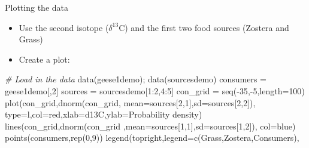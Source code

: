 \documentclass[
  ignorenonframetext,
  aspectratio=169]{beamer}
\newenvironment{Shaded}{\begin{snugshade}}{\end{snugshade}}
\newcommand{\AttributeTok}[1]{\textcolor[rgb]{0.77,0.63,0.00}{#1}}
\newcommand{\CommentTok}[1]{\textcolor[rgb]{0.56,0.35,0.01}{\textit{#1}}}
\newcommand{\DecValTok}[1]{\textcolor[rgb]{0.00,0.00,0.81}{#1}}
\newcommand{\FunctionTok}[1]{\textcolor[rgb]{0.00,0.00,0.00}{#1}}
\newcommand{\NormalTok}[1]{#1}
\newcommand{\OtherTok}[1]{\textcolor[rgb]{0.56,0.35,0.01}{#1}}
\newcommand{\SpecialCharTok}[1]{\textcolor[rgb]{0.00,0.00,0.00}{#1}}
\newcommand{\StringTok}[1]{\textcolor[rgb]{0.31,0.60,0.02}{#1}}
\providecommand{\tightlist}{%
  \setlength{\itemsep}{0pt}\setlength{\parskip}{0pt}}
\begin{document}
\begin{frame}[fragile]{Plotting the data}
\protect\hypertarget{plotting-the-data}{}
\small

\begin{itemize}
\tightlist
\item
  Use the second isotope (\(\delta^{13}\)C) and the first two food
  sources (Zostera and Grass)
\item
  Create a plot:
\end{itemize}

\begin{Shaded}
\begin{Highlighting}[]
\CommentTok{\# Load in the data}
\FunctionTok{data}\NormalTok{(geese1demo); }\FunctionTok{data}\NormalTok{(sourcesdemo)}
\NormalTok{consumers }\OtherTok{=}\NormalTok{ geese1demo[,}\DecValTok{2}\NormalTok{]}
\NormalTok{sources }\OtherTok{=}\NormalTok{ sourcesdemo[}\DecValTok{1}\SpecialCharTok{:}\DecValTok{2}\NormalTok{,}\DecValTok{4}\SpecialCharTok{:}\DecValTok{5}\NormalTok{]}
\NormalTok{con\_grid }\OtherTok{=} \FunctionTok{seq}\NormalTok{(}\SpecialCharTok{{-}}\DecValTok{35}\NormalTok{,}\SpecialCharTok{{-}}\DecValTok{5}\NormalTok{,}\AttributeTok{length=}\DecValTok{100}\NormalTok{)}
\FunctionTok{plot}\NormalTok{(con\_grid,}\FunctionTok{dnorm}\NormalTok{(con\_grid,}
                    \AttributeTok{mean=}\NormalTok{sources[}\DecValTok{2}\NormalTok{,}\DecValTok{1}\NormalTok{],}\AttributeTok{sd=}\NormalTok{sources[}\DecValTok{2}\NormalTok{,}\DecValTok{2}\NormalTok{]),}
     \AttributeTok{type=}\StringTok{\textquotesingle{}l\textquotesingle{}}\NormalTok{,}\AttributeTok{col=}\StringTok{\textquotesingle{}red\textquotesingle{}}\NormalTok{,}\AttributeTok{xlab=}\StringTok{\textquotesingle{}d13C\textquotesingle{}}\NormalTok{,}\AttributeTok{ylab=}\StringTok{\textquotesingle{}Probability density\textquotesingle{}}\NormalTok{)}
\FunctionTok{lines}\NormalTok{(con\_grid,}\FunctionTok{dnorm}\NormalTok{(con\_grid}
\NormalTok{                     ,}\AttributeTok{mean=}\NormalTok{sources[}\DecValTok{1}\NormalTok{,}\DecValTok{1}\NormalTok{],}\AttributeTok{sd=}\NormalTok{sources[}\DecValTok{1}\NormalTok{,}\DecValTok{2}\NormalTok{]),}
      \AttributeTok{col=}\StringTok{\textquotesingle{}blue\textquotesingle{}}\NormalTok{)}
\FunctionTok{points}\NormalTok{(consumers,}\FunctionTok{rep}\NormalTok{(}\DecValTok{0}\NormalTok{,}\DecValTok{9}\NormalTok{))}
\FunctionTok{legend}\NormalTok{(}\StringTok{\textquotesingle{}topright\textquotesingle{}}\NormalTok{,}\AttributeTok{legend=}\FunctionTok{c}\NormalTok{(}\StringTok{\textquotesingle{}Grass\textquotesingle{}}\NormalTok{,}\StringTok{\textquotesingle{}Zostera\textquotesingle{}}\NormalTok{,}\StringTok{\textquotesingle{}Consumers\textquotesingle{}}\NormalTok{),}

\end{Highlighting}
\end{Shaded}
\end{frame}
\end{document}
